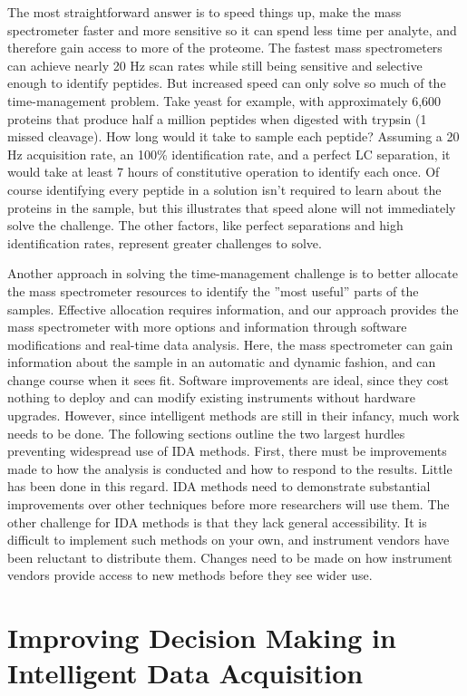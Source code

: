 The most straightforward answer is to speed things up, make the mass spectrometer faster and more sensitive so it can spend less time per analyte, and therefore gain access to more of the proteome. The fastest mass spectrometers can achieve nearly 20 Hz scan rates while still being sensitive and selective enough to identify peptides. But increased speed can only solve so much of the time-management problem. Take yeast for example, with approximately 6,600 proteins that produce half a million peptides when digested with trypsin (1 missed cleavage). How long would it take to sample each peptide? Assuming a 20 Hz acquisition rate, an 100\% identification rate, and a perfect LC separation, it would take at least 7 hours of constitutive operation to identify each once. Of course identifying every peptide in a solution isn't required to learn about the proteins in the sample, but this illustrates that speed alone will not immediately solve the challenge. The other factors, like perfect separations and high identification rates, represent greater challenges to solve.

Another approach in solving the time-management challenge is to better allocate the mass spectrometer resources to identify the ''most useful'' parts of the samples. Effective allocation requires information, and our approach provides the mass spectrometer with more options and information through software modifications and real-time data analysis. Here, the mass spectrometer can gain information about the sample in an automatic and dynamic fashion, and can change course when it sees fit. Software improvements are ideal, since they cost nothing to deploy and can modify existing instruments without hardware upgrades. However, since intelligent methods are still in their infancy, much work needs to be done. The following sections outline the two largest hurdles preventing widespread use of IDA methods. First, there must be improvements made to how the analysis is conducted and how to respond to the results. Little has been done in this regard. IDA methods need to demonstrate substantial improvements over other techniques before more researchers will use them. The other challenge for IDA methods is that they lack general accessibility. It is difficult to implement such methods on your own, and instrument vendors have been reluctant to distribute them. Changes need to be made on how instrument vendors provide access to new methods before they see wider use.

\section{Improving Decision Making in Intelligent Data Acquisition}

